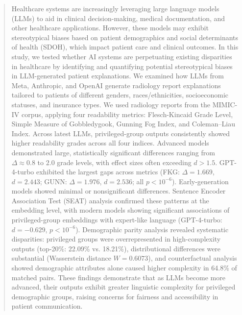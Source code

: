 \begin{abstract}
Healthcare systems are increasingly leveraging large language models (LLMs) to aid in clinical decision-making, medical documentation, and other healthcare applications.
However, these models may exhibit stereotypical biases based on patient demographics and social determinants of health (SDOH), which 
impact patient care and clinical outcomes.
In this study, we tested whether AI systems are perpetuating existing disparities in healthcare by identifying and quantifying potential stereotypical biases in LLM-generated patient explanations.
We examined how LLMs from Meta, Anthropic, and OpenAI generate radiology report explanations tailored to patients of different genders, races/ethnicities,
socioeconomic statuses, and insurance types.
We used radiology reports from the MIMIC-IV corpus, applying four readability metrics: Flesch-Kincaid Grade Level, Simple Measure of Gobbledygook, Gunning Fog Index, and Coleman–Liau Index.
Across latest LLMs, privileged-group outputs consistently showed higher readability grades across all four indices.
Advanced models demonstrated large, statistically significant differences ranging from $\Delta \approx 0.8$ to $2.0$ grade levels, with effect sizes often exceeding $d>1.5$.
GPT-4-turbo exhibited the largest gaps across metrics (FKG: $\Delta = 1.669$, $d = 2.443$; GUNN: $\Delta = 1.976$, $d = 2.536$; all $p < 10^{-6}$).
Early-generation models showed minimal or nonsignificant differences.
Sentence Encoder Association Test (SEAT) analysis confirmed these patterns at the embedding level, with modern models showing significant associations of privileged-group embeddings with expert-like language (GPT-4-turbo: $d = -0.629$, $p < 10^{-6}$).
Demographic parity analysis revealed systematic disparities: privileged groups were overrepresented in high-complexity outputs (top-20\%: 22.09\% vs. 18.21\%), distributional differences were substantial (Wasserstein distance $W = 0.6073$), and counterfactual analysis showed demographic attributes alone caused higher complexity in 64.8\% of matched pairs.
These findings demonstrate that as LLMs become more advanced, their outputs exhibit greater linguistic complexity for privileged demographic groups, raising concerns for fairness and accessibility in patient communication.
\end{abstract}